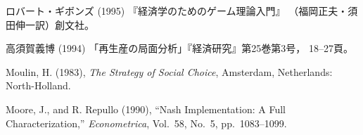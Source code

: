 \documentclass[main.tex]{subfiles}
\begin{document}
\newpage
{}
\begin{thebibliography}{99}

\item ロバート・ギボンズ (1995) 『経済学のためのゲーム理論入門』
（福岡正夫・須田伸一訳）創文社。

\item 高須賀義博 (1994) 「再生産の局面分析」『経済研究』第25巻第3号，
18--27頁。

\item Moulin, H. (1983), \emph{The Strategy of Social Choice}, Amsterdam, Netherlands:
North-Holland.

\item Moore, J., and R. Repullo (1990), ``Nash Implementation: A Full Characterization,''
\emph{Econometrica}, Vol.\ 58, No.\ 5, pp.\ 1083--1099.

\end{thebibliography}
\end{document}
